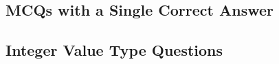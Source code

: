 \subsection*{MCQs with a Single Correct Answer}
\begin{enumerate}[label=\thechapter.\arabic*,ref=\thechapter.\theenumi]




\end{enumerate}

\subsection*{Integer Value Type Questions}
\begin{enumerate}[label=\thechapter.\arabic*,ref=\thechapter.\theenumi]



\end{enumerate}
